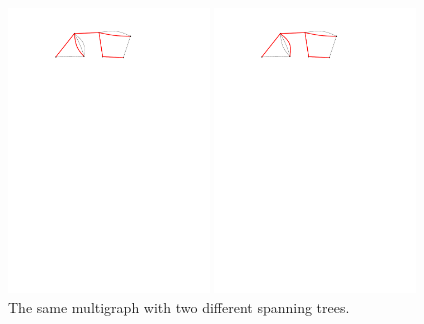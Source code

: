 \documentclass[11pt,a4paper,oneside]{article}
\begin{document}
\begin{center}
	\includegraphics[width=0.4\textwidth]{figures/multigraph-forest.pdf} \hspace{2cm}
	\includegraphics[width=0.4\textwidth]{figures/multigraph-forest-other.pdf} \\
	The same multigraph with two different spanning trees.
\end{center}
\end{document}
